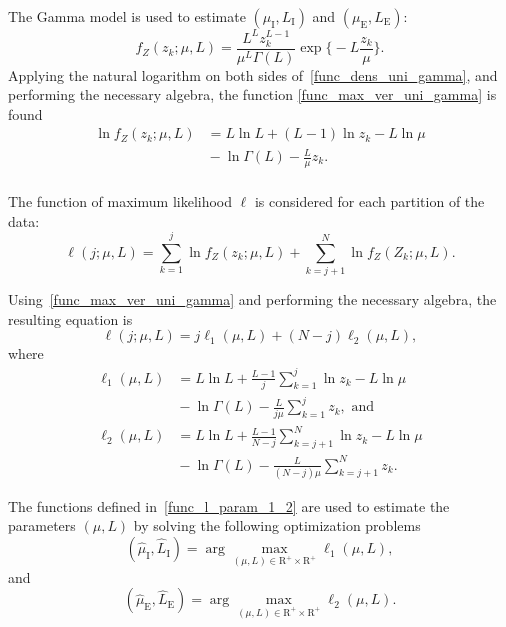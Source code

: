 \documentclass[journal]{IEEEtran}
\begin{document}
The Gamma model is used to estimate $(\mu_\text{I},L_\text{I})$ and $(\mu_\text{E},L_\text{E})$:
\begin{equation}\label{func_dens_uni_gamma}
	f_Z(z_k;\mu,L)=\frac{L^{L}z_k^{L-1}}{\mu^{L}\Gamma(L)} \exp\Big\{-L\frac{z_k}{\mu}\Big\}.
\end{equation}
Applying the natural logarithm on both sides of~\eqref{func_dens_uni_gamma}, and performing  the necessary algebra,  the function \eqref{func_max_ver_uni_gamma} is found
\begin{equation}\label{func_max_ver_uni_gamma}
\begin{split}
	\ln f_Z(z_k;\mu,L)&= L\ln L +(L - 1) \ln z_k-L \ln \mu \\
	 	                  &{}- \ln \Gamma(L) -\frac{L}{\mu} z_k.\\
\end{split}
\end{equation}

The function of maximum likelihood $\ell$ is considered for each partition of the data:
\begin{equation}\nonumber
\ell(j;\mu, L)=\sum_{k=1}^{j}\ln f_{Z}(z_k;\mu,L)
             +\sum_{k=j+1}^{N}\ln f_{Z}(Z_k;\mu,L).
\end{equation}
 
Using~\eqref{func_max_ver_uni_gamma} and performing the necessary algebra, the resulting equation is 
\begin{equation}\label{func_l_param}
  \ell(j;\mu, L)=j\ell_1(\mu, L) + (N - j)\ell_2(\mu, L),
 \end{equation}
where
\begin{equation}\label{func_l_param_1_2}
\begin{split}
    \ell_1(\mu, L)&=L\ln L+\frac{L-1}{j}\sum_{k=1}^{j}\ln z_k-L\ln\mu\\
    &{}-\ln\Gamma(L) -\frac{L}{j\mu}\sum_{k=1}^{j} z_k,\text{ and}\\
    \ell_2(\mu, L)&=L\ln L+\frac{L-1}{N-j}\sum_{k=j+1}^{N}\ln z_k-L\ln\mu\\
    &{}-\ln\Gamma(L) -\frac{L}{(N-j)\mu}\sum_{k=j+1}^{N} z_k.
 \end{split}
\end{equation}
 
The functions defined in~\eqref{func_l_param_1_2} are used to estimate the parameters $(\mu, L)$ by solving the following optimization problems 
\begin{equation}\label{optimiz_l_1}
(\widehat{\mu}_\text{I},\widehat{L}_\text{I})= \arg\max\limits_{(\mu,L)\in \mathrm{R}^{+}\times\mathrm{R}^{+}}\ell_1(\mu,L),
\end{equation}
and
\begin{equation}\label{optimiz_l_2}
(\widehat{\mu}_\text{E},\widehat{L}_\text{E})= \arg\max\limits_{(\mu,L)\in \mathrm{R}^{+}\times\mathrm{R}^{+}}\ell_2(\mu,L).
\end{equation} 
\end{document}
